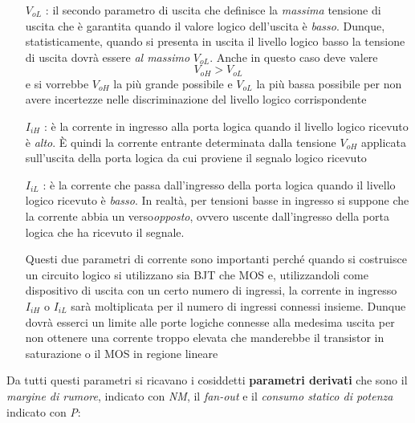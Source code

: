 \documentclass[12pt, a4paper]{report}
\begin{document}
\begin{itemize}
    \item[$V_{oL}$]: il secondo parametro di uscita che definisce la \textit{massima} tensione di uscita che è garantita quando il valore logico dell'uscita è \textit{basso}. Dunque, statisticamente, quando si presenta in uscita il livello logico basso la tensione di uscita dovrà essere \textit{al massimo} $V_{oL}$. Anche in questo caso deve valere
    \begin{equation}
        V_{oH} > V_{oL}
    \end{equation}
    e si vorrebbe $V_{oH}$ la più grande possibile e $V_{oL}$ la più bassa possibile per non avere incertezze nelle discriminazione del livello logico corrispondente
    \item[$I_{iH}$]: è la corrente in ingresso alla porta logica quando il livello logico ricevuto è \textit{alto}. È quindi la corrente entrante determinata dalla tensione $V_{oH}$ applicata sull'uscita della porta logica da cui proviene il segnalo logico ricevuto
    \item[$I_{iL}$]: è la corrente che passa dall'ingresso della porta logica quando il livello logico ricevuto è \textit{basso}. In realtà, per tensioni basse in ingresso si suppone che la corrente abbia un verso\textit{opposto}, ovvero uscente dall'ingresso della porta logica che ha ricevuto il segnale.
    
    Questi due parametri di corrente sono importanti perché quando si costruisce un circuito logico si utilizzano sia BJT che MOS e, utilizzandoli come dispositivo di uscita con un certo numero di ingressi, la corrente in ingresso $I_{iH}$ o $I_{iL}$ sarà moltiplicata per il numero di ingressi connessi insieme. Dunque dovrà esserci un limite alle porte logiche connesse alla medesima uscita per non ottenere una corrente troppo elevata che manderebbe il transistor in saturazione o il MOS in regione lineare
\end{itemize}
Da tutti questi parametri si ricavano i cosiddetti \textbf{parametri derivati} che sono il \textit{margine di rumore}, indicato con \textit{NM}, il \textit{fan-out} e il \textit{consumo statico di potenza} indicato con \textit{P}:
\end{document}
